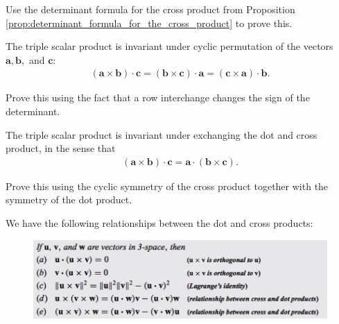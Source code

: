 \documentclass[12pt,letterpaper,reqno]{article}
\numberwithin{equation}{section}
\begin{document}
\begin{exercise}
Use the determinant formula for the cross product from Proposition \ref{prop:determinant_formula_for_the_cross_product} to prove this.
\end{exercise}

\begin{prop}
	The triple scalar product is invariant under cyclic permutation of the vectors $\mathbf{a}, \mathbf{b},$ and $\mathbf{c}$:
	\begin{align*}
		(\mathbf{a} \times \mathbf{b})\cdot \mathbf{c}=(\mathbf{b} \times \mathbf{c})\cdot \mathbf{a}=(\mathbf{c} \times \mathbf{a})\cdot \mathbf{b}.
	\end{align*}
\end{prop}

\begin{exercise}
Prove this using the fact that a row interchange changes the sign of the determinant.	
\end{exercise}

\begin{prop}
	The triple scalar product is invariant under exchanging the dot and cross product, in the sense that 
	\begin{align*}
		(\mathbf{a} \times \mathbf{b})\cdot \mathbf{c}=\mathbf{a} \cdot (\mathbf{b}\times \mathbf{c}).
	\end{align*}
\end{prop}

\begin{exercise}
Prove this using the cyclic symmetry of the cross product together with the symmetry of the dot product.	
\end{exercise}

\begin{prop}
We have the following relationships between the dot and cross products:
	\begin{figure}[h]
			\includegraphics[scale=0.3]{figures_mvc/rel_dot_cross_p}
	\end{figure}
\end{prop}
\end{document}
